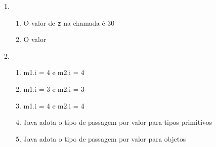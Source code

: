 \documentclass{article}
\begin{document}
\begin{enumerate}
\begin{enumerate}[label=(\alph*)]
                    \begin{lstlisting}[style=CStyle]
                        #include "stdio.h"
                        int x = 0;
                        int foo()
                        {
                            x++;
                            return 1;
                        }
                        #define MAX(X, Y) ((X) > (Y) ? (X) : (Y))
                        int main()
                        {
                            int y = MAX(0, foo());
                            printf("Max: %d, global x: %d\n", y, x);
                        }
                    \end{lstlisting}

                    Após a expansão da macro, como os argumentos passados irão ser substituídos no corpo da
                    macro, a função \texttt{foo} será chamada duas vezes, o que irá impactar no incremento da variável 
                    global \texttt{x}. A saída do código a seguir seria então:
                    
                    Max: 1, global x: 2
            \end{enumerate}

            \item
                \begin{enumerate}[label=(\alph*)]
                    \item
                        O valor de \texttt{z} na chamada é 30
                    \item
                        O valor 
                \end{enumerate}
            \item
                \begin{enumerate}[label=(\alph*)]
                    \item
                        m1.i = 4 e m2.i = 4
                    \item
                        m1.i = 3 e m2.i = 3
                    \item
                        m1.i = 4 e m2.i = 4
                    \item
                        Java adota o tipo de passagem por valor para tipos primitivos
                    \item
                        Java adota o tipo de passagem por valor para objetos
                \end{enumerate}
        
    \end{enumerate}
\end{document}
